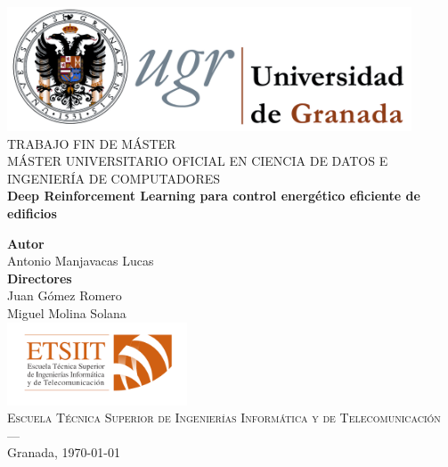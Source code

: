 \begin{titlepage}
 
 
\newlength{\centeroffset}
\setlength{\centeroffset}{-0.5\oddsidemargin}
\addtolength{\centeroffset}{0.5\evensidemargin}
\thispagestyle{empty}

\noindent\hspace*{\centeroffset}\begin{minipage}{\textwidth}

\centering
\includegraphics[width=0.9\textwidth]{imagenes/logo_ugr.png}\\[1.4cm]

\textsc{ \Large TRABAJO FIN DE MÁSTER\\[0.2cm]}
\textsc{ MÁSTER UNIVERSITARIO OFICIAL EN CIENCIA DE DATOS E INGENIERÍA DE COMPUTADORES}\\[1cm]

{\LARGE\bfseries Deep Reinforcement Learning para control energético eficiente de edificios\\
}
\end{minipage}

\vspace{1.5cm}
\noindent\hspace*{\centeroffset}\begin{minipage}{\textwidth}
\centering

\textbf{Autor}\\ {Antonio Manjavacas Lucas}\\[2.5ex]
\textbf{Directores}\\
{Juan Gómez Romero\\
Miguel Molina Solana}\\[2cm]
\includegraphics[width=0.4\textwidth]{imagenes/logo_etsiit.png}\\[0.1cm]
\textsc{Escuela Técnica Superior de Ingenierías Informática y de Telecomunicación}\\
\textsc{---}\\
Granada, \today
\end{minipage}


\end{titlepage}


